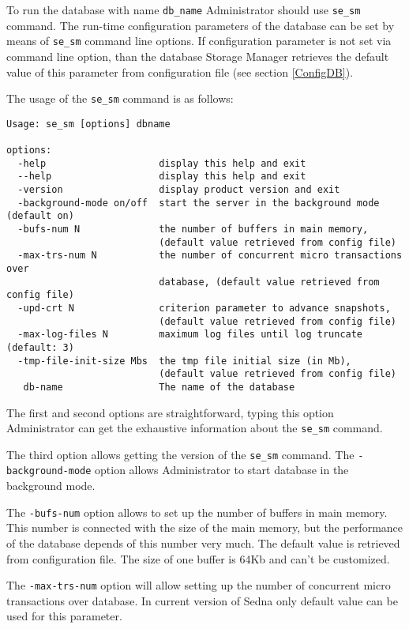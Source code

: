 \documentclass[a4paper,12pt]{article}
\begin{document}
To run the database with name \verb!db_name! Administrator should use \verb!se_sm! command. The run-time configuration parameters of the database can be set by means of \verb!se_sm! command line options. If configuration parameter is not set via command line option, than the database Storage Manager retrieves the default value of this parameter from configuration file (see section \ref{ConfigDB}).

The usage of the \verb!se_sm! command is as follows:

\begin{verbatim}
Usage: se_sm [options] dbname

options:
  -help                    display this help and exit
  --help                   display this help and exit
  -version                 display product version and exit
  -background-mode on/off  start the server in the background mode (default on)
  -bufs-num N              the number of buffers in main memory,
                           (default value retrieved from config file)
  -max-trs-num N           the number of concurrent micro transactions over
                           database, (default value retrieved from config file)
  -upd-crt N               criterion parameter to advance snapshots,
                           (default value retrieved from config file)
  -max-log-files N         maximum log files until log truncate (default: 3)
  -tmp-file-init-size Mbs  the tmp file initial size (in Mb),
                           (default value retrieved from config file)
   db-name                 The name of the database
\end{verbatim}

The first and second options are straightforward, typing this option Administrator can get the exhaustive information about the \verb!se_sm! command.

The third option allows getting the version of the \verb!se_sm! command.
The \verb!-background-mode! option allows Administrator to start database in the background mode.

The \verb!-bufs-num! option allows to set up the number of buffers in main memory. This number is connected with the size of the main memory, but the performance of the database depends of this number very much. The default value is retrieved from configuration file. The size of one buffer is 64Kb and can't be customized.

The \verb!-max-trs-num! option will allow setting up the number of concurrent micro transactions over database. In current version of Sedna only default value can be used for this parameter.
\end{document}
